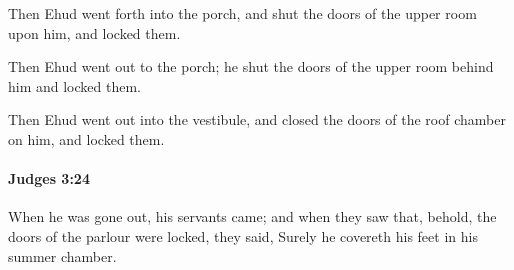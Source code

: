 			\begin{versebox}
					\item[BHS] 
					\item[ASV] Then Ehud went forth into the porch, and shut the doors of the upper room upon him, and locked them.
					\item[NIV] Then Ehud went out to the porch; he shut the doors of the upper room behind him and locked them.
					\item[NRSV] Then Ehud went out into the vestibule, and closed the doors of the roof chamber on him, and locked them.
			\end{versebox}

		\paragraph{Judges 3:24} %
			\label{JUDGES-3-24}

			When he was gone out, his servants came; and when they saw that, behold, the doors of the parlour were locked, they said, Surely he covereth his feet in his summer chamber.

